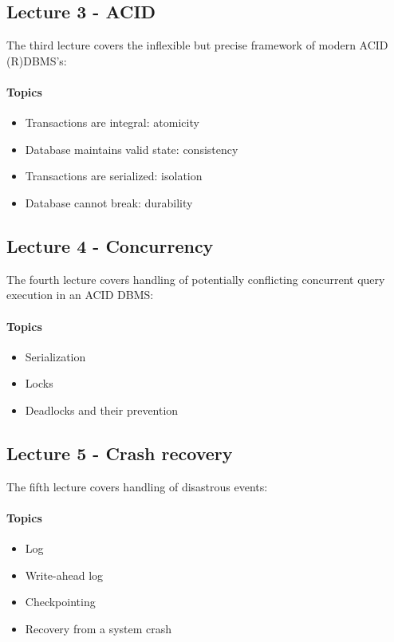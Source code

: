 	\subsection{Lecture 3 - ACID}
		The third lecture covers the inflexible but precise framework of modern ACID (R)DBMS's:

		\paragraph*{Topics}
			\begin{itemize}
				\item Transactions are integral: atomicity
				\item Database maintains valid state: consistency
				\item Transactions are serialized: isolation
				\item Database cannot break: durability
			\end{itemize}


	\subsection{Lecture 4 - Concurrency}
		The fourth lecture covers handling of potentially conflicting concurrent query execution in an ACID DBMS:

		\paragraph*{Topics}
			\begin{itemize}
				\item Serialization
				\item Locks
				\item Deadlocks and their prevention
			\end{itemize}


	\subsection{Lecture 5 - Crash recovery}
		The fifth lecture covers handling of disastrous events:

		\paragraph*{Topics}
			\begin{itemize}
				\item Log
				\item Write-ahead log
				\item Checkpointing
				\item Recovery from a system crash
			\end{itemize}


